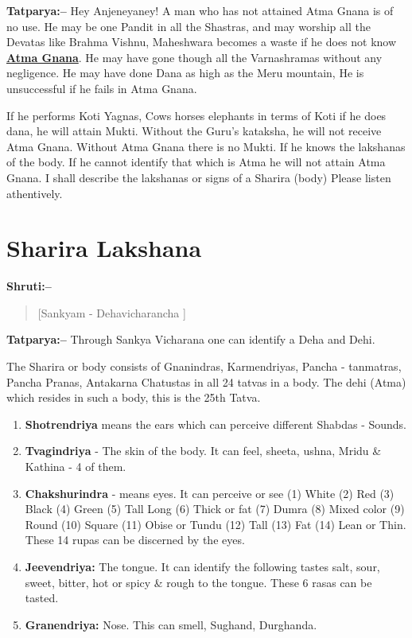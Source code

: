 \textbf{Tatparya:–} Hey Anjeneyaney! A man who has not attained Atma Gnana is of no use. He may be one Pandit in all the Shastras, and may worship all the Devatas like Brahma Vishnu, Maheshwara becomes a waste if he does not know \underline{\textbf{Atma Gnana}}. He may have gone though all the Varnashramas without any negligence. He may have done Dana as high as the Meru mountain, He is unsuccessful if he fails in Atma Gnana.

If he performs Koti Yagnas, Cows horses elephants in terms of Koti if he does dana, he will attain Mukti. Without the Guru's kataksha, he will not receive Atma Gnana. Without Atma Gnana there is no Mukti. If he knows the lakshanas of the body. If he cannot identify that which is Atma he will not attain Atma Gnana. I shall describe the lakshanas or signs of a Sharira (body) Please listen athentively.

\chapter{Sharira Lakshana}

\textbf{Shruti:–}

\begin{verse}
[Sankyam - Dehavicharancha ]
\end{verse}

\textbf{Tatparya:–} Through Sankya Vicharana one can identify a Deha and Dehi.

The Sharira or body consists of Gnanindras, Karmendriyas, Pancha - tanmatras, Pancha Pranas, Antakarna Chatustas in all 24 tatvas in a body. The dehi (Atma) which resides in such a body, this is the 25th Tatva.

\begin{enumerate}
\item \textbf{Shotrendriya} means the ears which can perceive different Shabdas - Sounds.

 \item \textbf{Tvagindriya} - The skin of the body. It can feel, sheeta, ushna, Mridu \& Kathina - 4 of them.

 \item \textbf{Chakshurindra} - means eyes. It can perceive or see (1) White (2) Red (3) Black (4) Green (5) Tall Long (6) Thick or fat (7) Dumra (8) Mixed color (9) Round (10) Square (11) Obise or Tundu (12) Tall (13) Fat (14) Lean or Thin. These 14 rupas can be discerned by the eyes.

 \item \textbf{Jeevendriya:} The tongue. It can identify the following tastes salt, sour, sweet, bitter, hot or spicy \& rough to the tongue. These 6 rasas can be tasted.

 \item \textbf{Granendriya:} Nose. This can smell, Sughand, Durghanda.

\end{enumerate}

